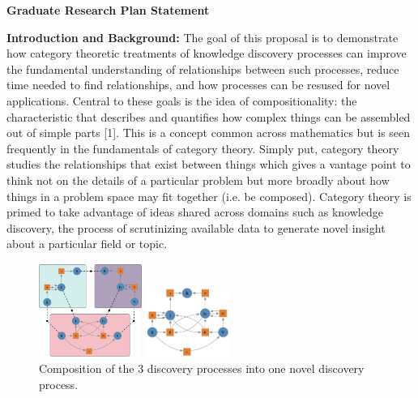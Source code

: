 \documentclass[11pt]{extarticle}
\begin{document}
\textbf{Graduate Research Plan Statement}

\textbf{Introduction and Background:} The goal of this proposal is to demonstrate how category theoretic treatments of knowledge discovery processes can improve the fundamental understanding of relationships between such processes, reduce time needed to find relationships, and how processes can be resused for novel applications.
Central to these goals is the idea of compositionality: the characteristic that describes and quantifies how complex things can be assembled out of simple parts [1].
This is a concept common across mathematics but is seen frequently in the fundamentals of category theory.
Simply put, category theory studies the relationships that exist between things which gives a vantage point to think not on the details of a particular problem but more broadly about how things in a problem space may fit together (i.e. be composed).
Category theory is primed to take advantage of ideas shared across domains such as knowledge discovery, the process of scrutinizing available data to generate novel insight about a particular field or topic. %

\begin{figure}
\centering
\includegraphics[width=0.3\textwidth]{sub_models}
\vspace{-15pt}
\caption{
  3 discovery processes (the three different petri nets in boxes) with relationships defined by arrows and lines inside of and between processes. %
}
\vspace{10pt}
\includegraphics[width=0.25\textwidth]{composed_model}
\vspace{-10pt}
\caption{
  Composition of the 3 discovery processes into one novel discovery process. %
}
\end{figure}
\end{document}
